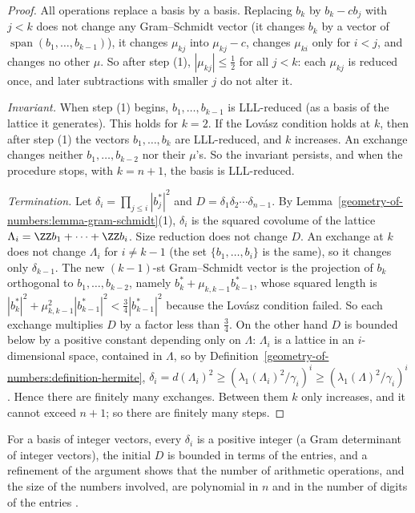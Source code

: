 \begin{proof}
All operations replace a basis by a basis. Replacing $b_k$ by $b_k - cb_j$ with $j < k$ does not change any Gram--Schmidt vector (it changes $b_k$ by a vector of $\operatorname{span}(b_1, \ldots, b_{k-1})$), it
changes $\mu_{kj}$ into $\mu_{kj} - c$, changes $\mu_{ki}$ only for $i < j$, and changes no other $\mu$. So after step (1), $|\mu_{kj}| \leq \frac12$ for all $j < k$: each $\mu_{kj}$ is reduced once, and
later subtractions with smaller $j$ do not alter it.

\emph{Invariant.} When step (1) begins, $b_1, \ldots, b_{k-1}$ is LLL-reduced (as a basis of the lattice it generates). This holds for $k = 2$. If the Lov\'asz condition holds at $k$, then after
step (1) the vectors $b_1, \ldots, b_k$ are LLL-reduced, and $k$ increases. An exchange changes neither $b_1, \ldots, b_{k-2}$ nor their $\mu$'s. So the invariant persists, and when the procedure
stops, with $k = n + 1$, the basis is LLL-reduced.

\emph{Termination.} Let $\delta_i = \prod_{j \leq i}|b_j^*|^2$ and $D = \delta_1\delta_2\cdots\delta_{n-1}$. By Lemma~\ref{geometry-of-numbers:lemma-gram-schmidt}(1), $\delta_i$ is the squared covolume of the
lattice $\Lambda_i = \ZZ b_1 + \cdots + \ZZ b_i$. Size reduction does not change $D$. An exchange at $k$ does not change $\Lambda_i$ for $i \neq k - 1$ (the set $\{b_1, \ldots, b_i\}$ is the same), so it
changes only $\delta_{k-1}$. The new $(k-1)$-st Gram--Schmidt vector is the projection of $b_k$ orthogonal to $b_1, \ldots, b_{k-2}$, namely $b_k^* + \mu_{k,k-1}b_{k-1}^*$, whose squared length is
$|b_k^*|^2 + \mu_{k,k-1}^2|b_{k-1}^*|^2 < \frac34|b_{k-1}^*|^2$ because the Lov\'asz condition failed. So each exchange multiplies $D$ by a factor less than $\frac34$. On the other hand $D$ is bounded below by
a positive constant depending only on $\Lambda$: $\Lambda_i$ is a lattice in an $i$-dimensional space, contained in $\Lambda$, so by Definition~\ref{geometry-of-numbers:definition-hermite},
$\delta_i = d(\Lambda_i)^2 \geq (\lambda_1(\Lambda_i)^2/\gamma_i)^i \geq (\lambda_1(\Lambda)^2/\gamma_i)^i$. Hence there are finitely many exchanges. Between them $k$ only increases, and it cannot exceed
$n + 1$; so there are finitely many steps.
\end{proof}

For a basis of integer vectors, every $\delta_i$ is a positive integer (a Gram determinant of integer vectors), the initial $D$ is bounded in terms of the entries, and a refinement of the argument shows
that the number of arithmetic operations, and the size of the numbers involved, are polynomial in $n$ and in the number of digits of the entries \cite{lll-1982}.

